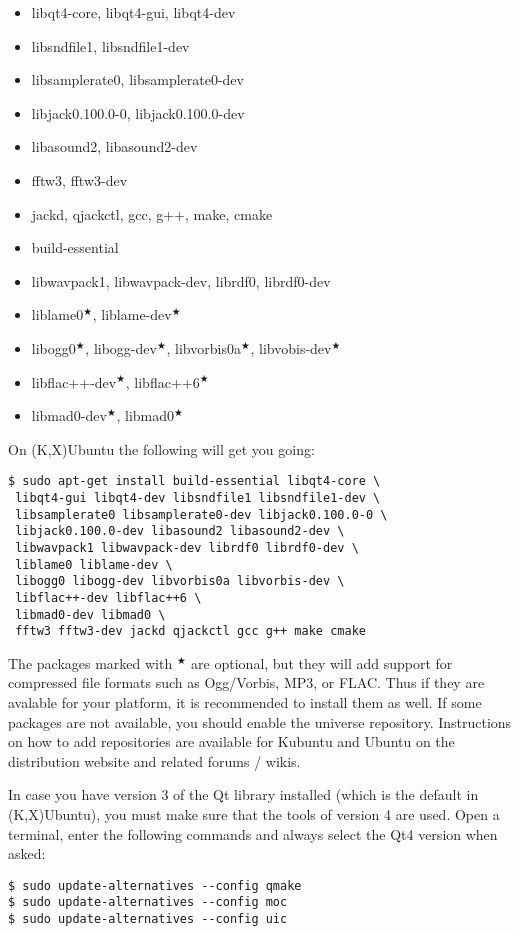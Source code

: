 \begin{itemize}
 \item libqt4-core, libqt4-gui, libqt4-dev
 \item libsndfile1, libsndfile1-dev
 \item libsamplerate0, libsamplerate0-dev
 \item libjack0.100.0-0, libjack0.100.0-dev
 \item libasound2, libasound2-dev
 \item fftw3, fftw3-dev
 \item jackd, qjackctl, gcc, g++, make, cmake
 \item build-essential
 \item libwavpack1, libwavpack-dev, librdf0, librdf0-dev
 \item liblame0$^\bigstar$, liblame-dev$^\bigstar$
 \item libogg0$^\bigstar$, libogg-dev$^\bigstar$, libvorbis0a$^\bigstar$, libvobis-dev$^\bigstar$
 \item libflac++-dev$^\bigstar$, libflac++6$^\bigstar$
 \item libmad0-dev$^\bigstar$, libmad0$^\bigstar$
\end{itemize}
On (K,X)Ubuntu the following will get you going:
\begin{verbatim}
$ sudo apt-get install build-essential libqt4-core \
 libqt4-gui libqt4-dev libsndfile1 libsndfile1-dev \
 libsamplerate0 libsamplerate0-dev libjack0.100.0-0 \
 libjack0.100.0-dev libasound2 libasound2-dev \
 libwavpack1 libwavpack-dev librdf0 librdf0-dev \
 liblame0 liblame-dev \
 libogg0 libogg-dev libvorbis0a libvorbis-dev \
 libflac++-dev libflac++6 \
 libmad0-dev libmad0 \
 fftw3 fftw3-dev jackd qjackctl gcc g++ make cmake
\end{verbatim}
The packages marked with $^\bigstar$ are optional, but they will add support for compressed file formats such as Ogg/Vorbis, MP3, or FLAC. Thus if they are avalable for your platform, it is recommended to install them as well. If some packages are not available, you should enable the universe repository. Instructions on how to add repositories are available for Kubuntu and Ubuntu on the distribution website and related forums / wikis.

In case you have version 3 of the Qt library installed (which is the default in (K,X)Ubuntu), you must make sure that the tools of version 4 are used. Open a terminal, enter the following commands and always select the Qt4 version when asked:

\begin{verbatim}
$ sudo update-alternatives --config qmake
$ sudo update-alternatives --config moc
$ sudo update-alternatives --config uic
\end{verbatim}


